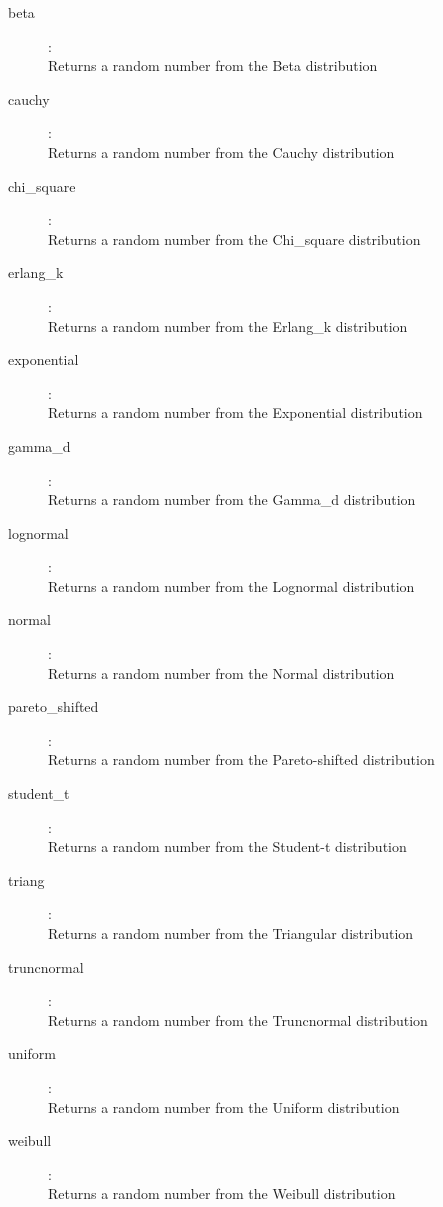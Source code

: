 \begin{description}
\item[beta]:  \\
    Returns a random number from the Beta distribution
\item[cauchy]:  \\
    Returns a random number from the Cauchy distribution
\item[chi\_square]:  \\
    Returns a random number from the Chi\_square distribution
\item[erlang\_k]:  \\
    Returns a random number from the Erlang\_k distribution
\item[exponential]:  \\
    Returns a random number from the Exponential distribution
\item[gamma\_d]:  \\
    Returns a random number from the Gamma\_d distribution
\item[lognormal]:  \\
    Returns a random number from the Lognormal distribution
\item[normal]:  \\
    Returns a random number from the Normal distribution
\item[pareto\_shifted]:  \\
    Returns a random number from the Pareto-shifted distribution
\item[student\_t]:  \\
    Returns a random number from the Student-t distribution
\item[triang]:  \\
    Returns a random number from the Triangular distribution
\item[truncnormal]:  \\
    Returns a random number from the Truncnormal distribution
\item[uniform]:  \\
    Returns a random number from the Uniform distribution
\item[weibull]:  \\
    Returns a random number from the Weibull distribution

\end{description}

